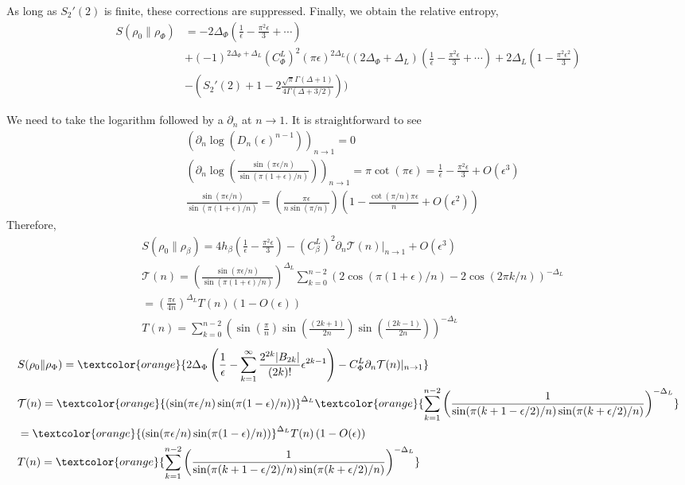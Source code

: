 \documentclass[11pt]{article}
\newcommand{\ep}{\epsilon}
\newcommand{\p}{\partial}
\newcommand{\nn}{\nonumber}
\newcommand{\lb}{\left(}
\newcommand{\rb}{\right)}
\newcommand{\JM}[1]{\textcolor{orange}{#1}}
\begin{document}
As long as $S_2'(2)$ is finite, these corrections are suppressed.
Finally, we obtain the relative entropy,
\begin{align}
    S(\rho_0\|\rho_\Phi) &= - 2\Delta_\Phi \lb \frac{1}{\ep} - \frac{\pi^2\ep}{3} +\cdots \rb \nn \\&+ (-1)^{2\Delta_\Phi + \Delta_L}{(C_\Phi^L)}^2 (\pi \ep)^{2\Delta_L } \Bigg( (2\Delta_\Phi + \Delta_L  ) \lb \frac{1}{\ep} - \frac{\pi^2 \ep}{3}+\cdots\rb+2\Delta_L \lb 1-\frac{\pi^2 \ep^2}{3}\rb \nn \\
    &- \lb  S_2'(2) +1 - 2\frac{\sqrt \pi \Gamma (\Delta +1)}{4\Gamma (\Delta + 3/2)} \rb\Bigg)
\end{align}

We need to take the logarithm followed by a $\partial_n$ at $n\to 1$. It is straightforward to see
\begin{align}
&  \lb \p_n\log \lb D_n(\ep)^{n-1}\rb\rb_{n\to 1}=0\nn\\
&\lb \p_n\log \lb \frac{\sin(\pi\epsilon/n)}{\sin(\pi(1+\epsilon)/n)}\rb\rb_{n\to 1}=\pi\cot(\pi\ep)=\frac{1}{\ep}-\frac{\pi^2 \ep}{3}+O(\ep^3)\nn\\
&\frac{\sin(\pi\epsilon/n)}{\sin(\pi(1+\epsilon)/n)}=\lb\frac{\pi \ep}{n\sin(\pi/n)} \rb
\lb 1-\frac{\cot(\pi/n)\pi \ep}{n}+O(\ep^2)\rb
\end{align}
Therefore,
\begin{align}
  &S(\rho_0\|\rho_\beta)=4h_\beta\lb\frac{1}{\ep}-\frac{\pi^2\ep}{3}\rb- {(C_\beta^L)}^2 \p_n\mathcal{T}(n)|_{n\to 1}+O(\ep^3)\nn\\
  &\mathcal{T}(n)=\lb\frac{\sin(\pi\epsilon/n)}{\sin(\pi(1+\epsilon)/n)}\rb^{\Delta_L}\sum_{k=0}^{n-2} \lb 2\cos(\pi(1+\ep)/n)-2\cos(2\pi k/n) \rb^{-\Delta_L}\nn\\
  &=\lb\frac{\pi \ep}{4n}\rb^{\Delta_L}T(n)\lb 1-O(\ep)\rb\nn\\
  &T(n)=\sum_{k=0}^{n-2}\lb \sin\lb\frac{\pi}{n}\rb\sin\lb\frac{(2k+1)}{2n}\rb\sin\lb \frac{(2k-1)}{2n}\rb\rb^{-\Delta_L}
\end{align}
\begin{align*}
  &S(\rho_0\|\rho_\Phi)=\JM{2\Delta_\Phi \lb\frac{1}{\ep}- \sum_{k=1}^{\infty} \frac{2^{2k}|B_{2k}|} {(2k)!}\ep^{2k-1} 
  \rb - C_\Phi^L \p_n\mathcal{T}(n)|_{n\to 1}}\nn\\
  &\mathcal{T}(n)=\JM{\lb\sin(\pi\epsilon/n)\sin(\pi(1-\epsilon)/n)\rb}^{\Delta_L}\JM{\sum_{k=1}^{n-2} \lb \frac{1}{\sin(\pi (k+1-\ep/2)/n) \sin (\pi (k+\ep/2) /n)}\rb^{-\Delta_L}}\nn\\
  &=\JM{\lb\sin(\pi\epsilon/n)\sin(\pi(1-\epsilon)/n)\rb}^{\Delta_L}T(n)\lb 1-O(\ep)\rb\nn\\
  &T(n)=\JM{\sum_{k=1}^{n-2}\lb \frac{1}{\sin(\pi (k+1-\ep/2)/n) \sin (\pi (k+\ep/2) /n)}\rb^{-\Delta_L}}
\end{align*}
\end{document}
